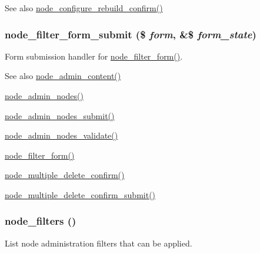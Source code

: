 \begin{DoxySeeAlso}{See also}
\hyperlink{group__forms_ga650b907eb478b9c293e4b93e3ecb560d}{node\_\-configure\_\-rebuild\_\-confirm()} 
\end{DoxySeeAlso}
\hypertarget{node_8admin_8inc_a346f00ebb9b4aae36025623d893c5061}{
\subsubsection[{node\_\-filter\_\-form\_\-submit}]{\setlength{\rightskip}{0pt plus 5cm}node\_\-filter\_\-form\_\-submit (\$ {\em form}, \/  \&\$ {\em form\_\-state})}}
\label{node_8admin_8inc_a346f00ebb9b4aae36025623d893c5061}
Form submission handler for \hyperlink{group__forms_ga2b7edb82b488db11ffde4fa60958004d}{node\_\-filter\_\-form()}.

\begin{DoxySeeAlso}{See also}
\hyperlink{group__forms_ga9e864b6f961a37906f23989987913091}{node\_\-admin\_\-content()} 

\hyperlink{group__forms_ga3fb56c702a3c16eddd2fcd8ccd3e4adb}{node\_\-admin\_\-nodes()} 

\hyperlink{node_8admin_8inc_a5f159cfed0d6cce65d5d70747efec391}{node\_\-admin\_\-nodes\_\-submit()} 

\hyperlink{node_8admin_8inc_a32a9ea91250aaf84de44f784a3569944}{node\_\-admin\_\-nodes\_\-validate()} 

\hyperlink{group__forms_ga2b7edb82b488db11ffde4fa60958004d}{node\_\-filter\_\-form()} 

\hyperlink{group__forms_ga25cc06a5aa3aa17eadc5a8a97e7c5e9e}{node\_\-multiple\_\-delete\_\-confirm()} 

\hyperlink{node_8admin_8inc_ab8a2e11edeef2797ca739f94d1eb1af9}{node\_\-multiple\_\-delete\_\-confirm\_\-submit()} 
\end{DoxySeeAlso}
\hypertarget{node_8admin_8inc_aa9c4e0dc2b5e8a9ca9c855161ca02969}{
\subsubsection[{node\_\-filters}]{\setlength{\rightskip}{0pt plus 5cm}node\_\-filters ()}}
\label{node_8admin_8inc_aa9c4e0dc2b5e8a9ca9c855161ca02969}
List node administration filters that can be applied.

